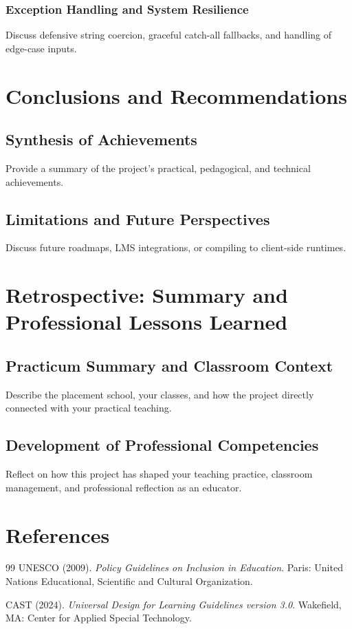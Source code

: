 \documentclass[12pt,a4paper]{report}
\begin{document}
\subsection{Exception Handling and System Resilience}
Discuss defensive string coercion, graceful catch-all fallbacks, and handling of edge-case inputs.

\chapter{Conclusions and Recommendations}
\section{Synthesis of Achievements}
Provide a summary of the project's practical, pedagogical, and technical achievements.

\section{Limitations and Future Perspectives}
Discuss future roadmaps, LMS integrations, or compiling to client-side runtimes.

\chapter{Retrospective: Summary and Professional Lessons Learned}
\section{Practicum Summary and Classroom Context}
Describe the placement school, your classes, and how the project directly connected with your practical teaching.

\section{Development of Professional Competencies}
Reflect on how this project has shaped your teaching practice, classroom management, and professional reflection as an educator.

\chapter{References}
\begin{thebibliography}{99}
  UNESCO (2009). \textit{Policy Guidelines on Inclusion in Education}. Paris: United Nations Educational, Scientific and Cultural Organization.

  CAST (2024). \textit{Universal Design for Learning Guidelines version 3.0}. Wakefield, MA: Center for Applied Special Technology.
\end{thebibliography}
\end{document}
